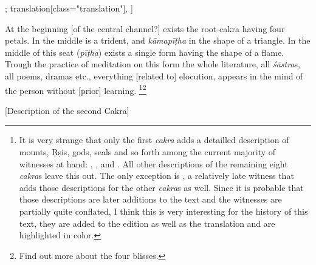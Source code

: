 \documentclass[12pt]{article}%
\def\om{\textrm{\foreignlanguage{english}{\footnotesize omitted in\ }}} %
\begin{document}
\begin{alignment}[
    texts=edition[class="edition"];
    translation[class="translation"],
  ]
\begin{translation}
 \begin{tlate}At the beginning [of the central channel?] exists the root-cakra having four petals.  In the middle is a trident, and \textit {kāmapīṭha} in the shape of a triangle. In the middle of this seat (\textit{pīṭha}) exists a single form having the shape of a flame. Trough the practice of meditation on this form the whole literature, all \textit{śāstra}s, all poems, dramas etc., everything [related to] elocution, appears in the mind of the person without [prior] learning. \footnote{It is very strange that only the first \textit{cakra} adds a detailled description of mounts, Ṛṣis, gods, seals and so forth among the current majority of witnesses at hand: , ,  and . All other descriptions of the remaining eight \textit{cakra}s leave this out. The only exception is , a relatively late witness that adds those descriptions for the other \textit{cakra}s as well. Since it is probable that those descriptions are later additions to the text and the witnesses are partially quite conflated, I think this is very interesting for the history of this text, they are added to the edition as well as the translation and are highlighted in color.}\footnote{Find out more about the four blisses.} \end{tlate}
   \end{translation}
   \begin{edition}
     \bigskip
    \centerline{\textrm{\small{[Description of the second Cakra]}}}
    \bigskip
    \begin{prose}

\end{prose}
\end{edition}
\end{alignment}
\end{document}
